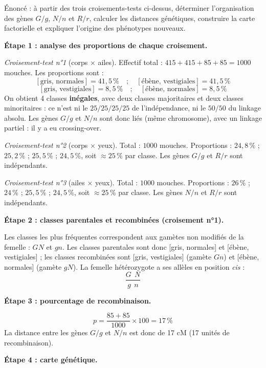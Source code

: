\documentclass[11pt]{article}
\newcommand{\cle}[1]{{\popxbold\color{popdark}#1}}
\begin{document}
\begin{exoresolu}
Énoncé : à partir des trois croisements-tests ci-dessus, déterminer l'organisation des gènes $G/g$, $N/n$ et $R/r$, calculer les distances génétiques, construire la carte factorielle et expliquer l'origine des phénotypes nouveaux.

\tcblower

\textbf{Étape 1 : analyse des proportions de chaque croisement.}

\emph{Croisement-test n°1} (corps $\times$ ailes). Effectif total : $415 + 415 + 85 + 85 = \num{1000}$ mouches. Les proportions sont :
\[ [\text{gris, normales}] = 41,5\,\% \quad ; \quad [\text{ébène, vestigiales}] = 41,5\,\% \]
\[ [\text{gris, vestigiales}] = 8,5\,\% \quad ; \quad [\text{ébène, normales}] = 8,5\,\% \]
On obtient 4 classes \textbf{inégales}, avec deux classes majoritaires et deux classes minoritaires : ce n'est ni le $25/25/25/25$ de l'indépendance, ni le $50/50$ du linkage absolu. Les gènes $G/g$ et $N/n$ sont donc \cle{liés} (même chromosome), avec un \cle{linkage partiel} : il y a eu crossing-over.

\emph{Croisement-test n°2} (corps $\times$ yeux). Total : $\num{1000}$ mouches. Proportions : $24,8\,\%$ ; $25,2\,\%$ ; $25,5\,\%$ ; $24,5\,\%$, soit $\approx 25\,\%$ par classe. Les gènes $G/g$ et $R/r$ sont \cle{indépendants}.

\emph{Croisement-test n°3} (ailes $\times$ yeux). Total : $\num{1000}$ mouches. Proportions : $26\,\%$ ; $24\,\%$ ; $25,5\,\%$ ; $24,5\,\%$, soit $\approx 25\,\%$ par classe. Les gènes $N/n$ et $R/r$ sont \cle{indépendants}.

\textbf{Étape 2 : classes parentales et recombinées (croisement n°1).}

Les classes les plus fréquentes correspondent aux gamètes non modifiés de la femelle : $GN$ et $gn$. Les classes parentales sont donc [gris, normales] et [ébène, vestigiales] ; les classes recombinées sont [gris, vestigiales] (gamète $Gn$) et [ébène, normales] (gamète $gN$). La femelle hétérozygote a ses allèles en position \emph{cis} :
\[ \dfrac{G\ \ N}{g\ \ n} \]

\textbf{Étape 3 : pourcentage de recombinaison.}

\[ p = \frac{85 + 85}{1000} \times 100 = 17\,\% \]
La distance entre les gènes $G/g$ et $N/n$ est donc de \cle{17 cM} (17 unités de recombinaison).

\textbf{Étape 4 : carte génétique.}


\end{exoresolu}
\end{document}
